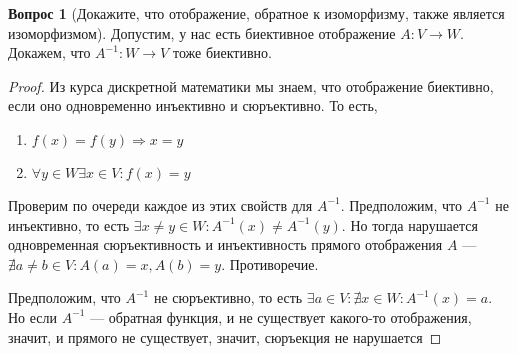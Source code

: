 \documentclass[a4paper,11pt]{article}
\theoremstyle{remark}
\theoremstyle{definition}
\newtheorem{question}{Вопрос}
\numberwithin{question}{subsection}
\begin{document}
\begin{question}[Докажите, что отображение, обратное к изоморфизму, также является изоморфизмом]
Допустим, у нас есть биективное отображение \(A: V \rightarrow W\). Докажем, что \(A^{-1}: W \rightarrow V\) тоже биективно.
\begin{proof}
Из курса дискретной математики мы знаем, что отображение биективно, если оно одновременно инъективно и сюръективно. То есть,
\begin{enumerate}
	\item \(f(x) = f(y) \Rightarrow x = y\)
	\item \(\forall y \in W \exists x \in V: f(x) = y\)
\end{enumerate}

Проверим по очереди каждое из этих свойств для \(A^{-1}\). Предположим, что \(A^{-1}\) не инъективно, то есть \(\exists x \neq y \in W: A^{-1}(x) \neq A^{-1}(y)\). Но тогда нарушается одновременная сюръективность и инъективность прямого отображения \(A\) --- \(\nexists a \neq b \in V: A(a) = x, A(b) = y\). Противоречие.

Предположим, что \(A^{-1}\) не сюръективно, то есть \(\exists a \in V: \nexists x \in W: A^{-1}(x) = a\). Но если \(A^{-1}\) --- обратная функция, и не существует какого-то отображения, значит, и прямого не существует, значит, сюръекция не нарушается 
\end{proof}
\end{question}
\end{document}
